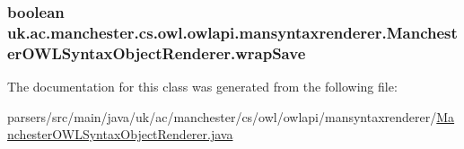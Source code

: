 \hypertarget{classuk_1_1ac_1_1manchester_1_1cs_1_1owl_1_1owlapi_1_1mansyntaxrenderer_1_1_manchester_o_w_l_syntax_object_renderer_a0ee1ee9ad28523694c94aa82b4859759}{
\subsubsection[{wrap\-Save}]{\setlength{\rightskip}{0pt plus 5cm}boolean uk.\-ac.\-manchester.\-cs.\-owl.\-owlapi.\-mansyntaxrenderer.\-Manchester\-O\-W\-L\-Syntax\-Object\-Renderer.\-wrap\-Save\hspace{0.3cm}{\ttfamily [private]}}}\label{classuk_1_1ac_1_1manchester_1_1cs_1_1owl_1_1owlapi_1_1mansyntaxrenderer_1_1_manchester_o_w_l_syntax_object_renderer_a0ee1ee9ad28523694c94aa82b4859759}


The documentation for this class was generated from the following file\-:\begin{DoxyCompactItemize}
\item 
parsers/src/main/java/uk/ac/manchester/cs/owl/owlapi/mansyntaxrenderer/\hyperlink{_manchester_o_w_l_syntax_object_renderer_8java}{Manchester\-O\-W\-L\-Syntax\-Object\-Renderer.\-java}\end{DoxyCompactItemize}
